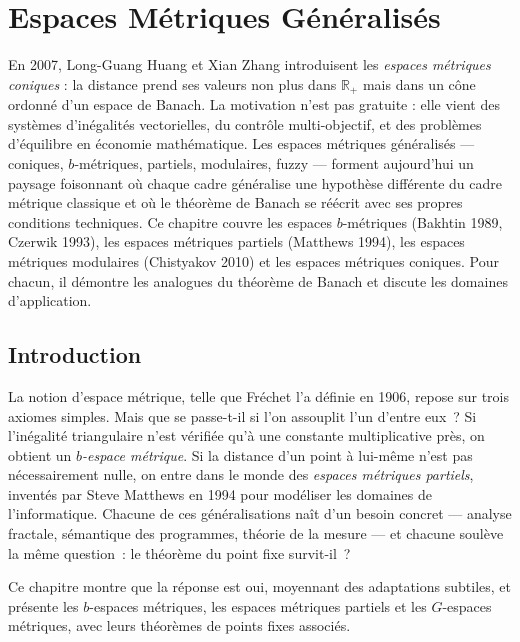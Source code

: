 \chapter{Espaces M\'etriques G\'en\'eralis\'es}\label{ch:espaces_generalises}

En 2007, Long-Guang Huang et Xian Zhang introduisent les \emph{espaces métriques coniques} : la distance prend ses valeurs non plus dans $\mathbb{R}_+$ mais dans un cône ordonné d'un espace de Banach. La motivation n'est pas gratuite : elle vient des systèmes d'inégalités vectorielles, du contrôle multi-objectif, et des problèmes d'équilibre en économie mathématique. Les espaces métriques généralisés --- coniques, $b$-métriques, partiels, modulaires, fuzzy --- forment aujourd'hui un paysage foisonnant où chaque cadre généralise une hypothèse différente du cadre métrique classique et où le théorème de Banach se réécrit avec ses propres conditions techniques. Ce chapitre couvre les espaces $b$-métriques (Bakhtin 1989, Czerwik 1993), les espaces métriques partiels (Matthews 1994), les espaces métriques modulaires (Chistyakov 2010) et les espaces métriques coniques. Pour chacun, il démontre les analogues du théorème de Banach et discute les domaines d'application.

\section{Introduction}

La notion d'espace m\'etrique, telle que Fr\'echet l'a d\'efinie en 1906, repose sur trois axiomes simples. Mais que se passe-t-il si l'on assouplit l'un d'entre eux~? Si l'in\'egalit\'e triangulaire n'est v\'erifi\'ee qu'\`a une constante multiplicative pr\`es, on obtient un \emph{$b$-espace m\'etrique}. Si la distance d'un point \`a lui-m\^eme n'est pas n\'ecessairement nulle, on entre dans le monde des \emph{espaces m\'etriques partiels}, invent\'es par Steve Matthews en 1994 pour mod\'eliser les domaines de l'informatique. Chacune de ces g\'en\'eralisations na\^it d'un besoin concret --- analyse fractale, s\'emantique des programmes, th\'eorie de la mesure --- et chacune soul\`eve la m\^eme question~: le th\'eor\`eme du point fixe survit-il~?

Ce chapitre montre que la r\'eponse est oui, moyennant des adaptations subtiles, et
pr\'esente les $b$-espaces m\'etriques, les espaces m\'etriques partiels et les
$G$-espaces m\'etriques, avec leurs th\'eor\`emes de points fixes associ\'es.

